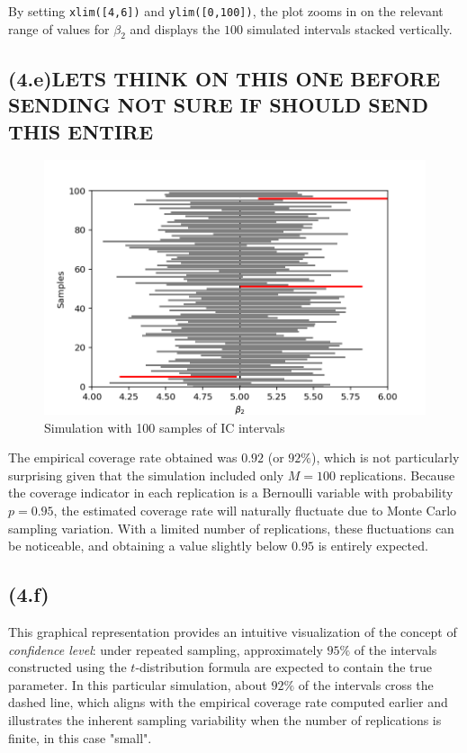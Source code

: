 \documentclass{article}
\begin{document}
By setting \texttt{xlim([4,6])} and \texttt{ylim([0,100])}, the plot zooms in on the relevant 
range of values for $\beta_2$ and displays the $100$ simulated intervals stacked vertically. 

\subsection*{(4.e)LETS THINK ON THIS ONE BEFORE SENDING NOT SURE IF SHOULD SEND THIS ENTIRE}

\begin{figure}[H]
  \centering
  \includegraphics[width=0.9\linewidth]{imagem_exercise.png}
  \caption{Simulation with 100 samples of IC intervals }
\end{figure}

The empirical coverage rate obtained was \(0.92\) (or \(92\%\)), which is not 
particularly surprising given that the simulation included only \(M = 100\) replications. 
Because the coverage indicator in each replication is a Bernoulli variable with 
probability \(p = 0.95\), the estimated coverage rate will naturally fluctuate due to 
Monte Carlo sampling variation. With a limited number of replications, these fluctuations 
can be noticeable, and obtaining a value slightly below \(0.95\) is entirely expected. 

\subsection*{(4.f)}

This graphical representation provides an intuitive visualization of the concept 
of \emph{confidence level}: under repeated sampling, approximately $95\%$ of the 
intervals constructed using the $t$-distribution formula are expected to contain 
the true parameter. In this particular simulation, about $92\%$ of the intervals 
cross the dashed line, which aligns with the empirical coverage rate computed 
earlier and illustrates the inherent sampling variability when the number of 
replications is finite, in this case "small".
\end{document}
